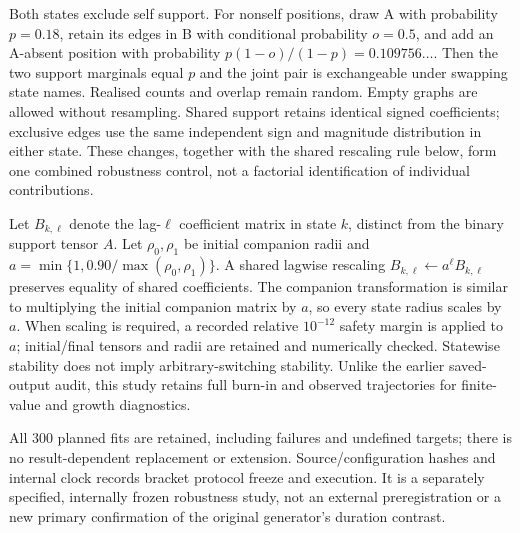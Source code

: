 \documentclass[11pt]{article}
\begin{document}
Both states exclude self support. For nonself positions, draw A with
probability $p=0.18$, retain its edges in B with conditional probability
$o=0.5$, and add an A-absent position with probability
$p(1-o)/(1-p)=0.109756\ldots$. Then the two support marginals equal $p$ and
the joint pair is exchangeable under swapping state names. Realised counts
and overlap remain random. Empty graphs are allowed without resampling.
Shared support retains identical signed coefficients; exclusive edges use
the same independent sign and magnitude distribution in either state.
These changes, together with the shared rescaling rule below, form one combined
robustness control, not a factorial identification of individual contributions.

Let $B_{k,\ell}$ denote the lag-$\ell$ coefficient matrix in state $k$,
distinct from the binary support tensor $A$. Let $\rho_0,\rho_1$ be initial companion radii and
$a=\min\{1,0.90/\max(\rho_0,\rho_1)\}$. A shared lagwise rescaling
$B_{k,\ell}\leftarrow a^\ell B_{k,\ell}$ preserves equality of shared
coefficients. The companion transformation is similar to multiplying the
initial companion matrix by $a$, so every state radius scales by $a$.
When scaling is required, a recorded relative $10^{-12}$ safety margin is
applied to $a$; initial/final tensors and radii are retained and numerically
checked. Statewise stability does not imply arbitrary-switching stability.
Unlike the earlier saved-output audit, this study retains full burn-in and
observed trajectories for finite-value and growth diagnostics.

All 300 planned fits are retained, including failures and undefined targets;
there is no result-dependent replacement or extension. Source/configuration
hashes and internal clock records bracket protocol freeze and execution.
It is a separately specified, internally frozen robustness study, not an external preregistration
or a new primary confirmation of the original generator's duration contrast.
\begin{table}[!htbp]\centering\small
\caption{All ten Study C window cells. $h/s$ denotes window size/stride.
Forced and raw-fallback gains are within-edge temporal AUROC
minus raw, with pointwise $95\%$ paired-repeat bootstrap intervals.
The $300/150$ and $300/300$ long-duration cells show that removing constant
fallback does not guarantee beneficial gate selection.}
\label{tab:reviewer-symmetric}
\resizebox{\linewidth}{!}{}
\end{table}
\end{document}
